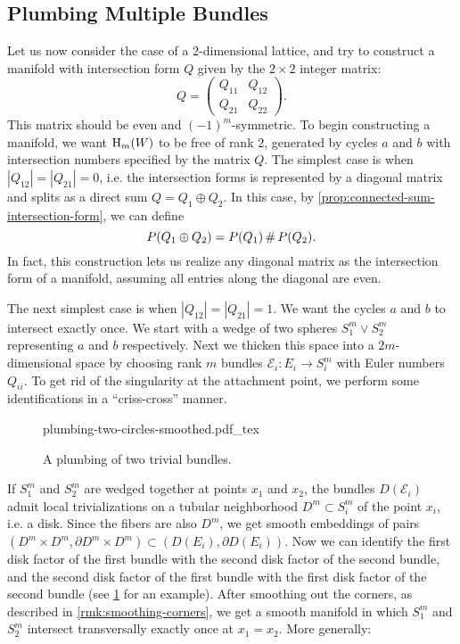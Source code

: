 \subsection{Plumbing Multiple Bundles}

Let us now consider the case of a $2$-dimensional lattice, and try to construct a manifold with intersection form $Q$ given by the $2\times 2$ integer matrix:
\[
	Q = \begin{pmatrix} Q_{11} & Q_{12} \\ Q_{21} & Q_{22}\end{pmatrix}.
\]
This matrix should be even and $(-1)^m$-symmetric. To begin constructing a manifold, we want $\operatorname{H}_m(W)$ to be free of rank $2$, generated by cycles $a$ and $b$ with intersection numbers specified by the matrix $Q$.
The simplest case is when $|Q_{12}|=|Q_{21}|=0$, i.e. the intersection forms is represented by a diagonal matrix and splits as a direct sum $Q=Q_1\oplus Q_2$. In this case, by \cref{prop:connected-sum-intersection-form}, we can define
\[
	P(Q_1\oplus Q_2) = P(Q_1)\+ P(Q_2).
\]
In fact, this construction lets us realize any diagonal matrix as the intersection form of a manifold, assuming all entries along the diagonal are even.

The next simplest case is when $|Q_{12}|=|Q_{21}|=1$. We want the cycles $a$ and $b$ to intersect exactly once. We start with a wedge of two spheres $S^m_1\vee S^m_2$ representing $a$ and $b$ respectively. Next we thicken this space into a $2m$-dimensional space by choosing rank $m$ bundles $\mathcal{E}_i : E_i \to S^m_i$ with Euler numbers $Q_{ii}$. To get rid of the singularity at the attachment point, we perform some identifications in a ``criss-cross'' manner.

\begin{figure}[ht]
	\centering
	{plumbing-two-circles-smoothed.pdf_tex}
	\caption{A plumbing of two trivial bundles.}\label{fig:plumbing-two-circles}
\end{figure}

If $S^m_1$ and $S^m_2$ are wedged together at points $x_1$ and $x_2$,
the bundles $D(\mathcal{E}_i)$ admit local trivializations on a tubular neighborhood $D^m \subset S^m_i$ of the point $x_i$, i.e. a disk.
Since the fibers are also $D^m$, we get smooth embeddings of pairs $(D^m\times D^m, \partial D^m\times D^m)\subset (D(E_i),\partial D(E_i))$.
Now we can identify the first disk factor of the first bundle with the second disk factor of the second bundle, and the second disk factor of the first bundle with the first disk factor of the second bundle (see \cref{fig:plumbing-two-circles} for an example). After smoothing out the corners, as described in \cref{rmk:smoothing-corners}, we get a smooth manifold in which $S_1^m$ and $S_2^m$ intersect transversally exactly once at $x_1=x_2$. More generally:

